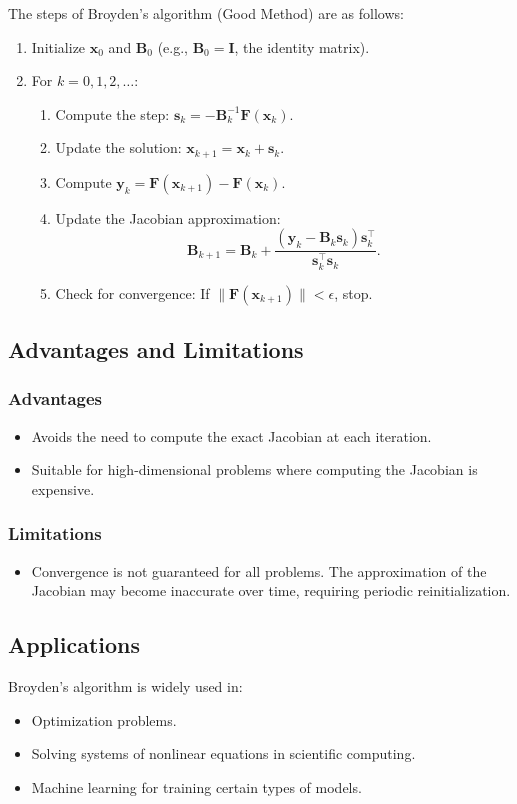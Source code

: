 \documentclass{article}
\begin{document}
The steps of Broyden’s algorithm (Good Method) are as follows:
\begin{enumerate}
   \item Initialize \( \mathbf{x}_0 \) and \( \mathbf{B}_0 \) (e.g., \( \mathbf{B}_0 = \mathbf{I} \), the identity matrix).
   \item For \( k = 0, 1, 2, \dots \):
   \begin{enumerate}
       \item Compute the step: \( \mathbf{s}_k = -\mathbf{B}_k^{-1} \mathbf{F}(\mathbf{x}_k) \).
       \item Update the solution: \( \mathbf{x}_{k+1} = \mathbf{x}_k + \mathbf{s}_k \).
       \item Compute \( \mathbf{y}_k = \mathbf{F}(\mathbf{x}_{k+1}) - \mathbf{F}(\mathbf{x}_k) \).
       \item Update the Jacobian approximation:
       \[
       \mathbf{B}_{k+1} = \mathbf{B}_k + \frac{(\mathbf{y}_k - \mathbf{B}_k \mathbf{s}_k) \mathbf{s}_k^\top}{\mathbf{s}_k^\top \mathbf{s}_k}.
       \]
       \item Check for convergence: If \( \|\mathbf{F}(\mathbf{x}_{k+1})\| < \epsilon \), stop.
   \end{enumerate}
\end{enumerate}

\subsection*{Advantages and Limitations}

\subsubsection*{Advantages}
\begin{itemize}
   \item Avoids the need to compute the exact Jacobian at each iteration.
   \item Suitable for high-dimensional problems where computing the Jacobian is expensive.
\end{itemize}

\subsubsection*{Limitations}
\begin{itemize}
   \item Convergence is not guaranteed for all problems.
   \� The approximation of the Jacobian may become inaccurate over time, requiring periodic reinitialization.
\end{itemize}

\subsection*{Applications}

Broyden’s algorithm is widely used in:
\begin{itemize}
   \item Optimization problems.
   \item Solving systems of nonlinear equations in scientific computing.
   \item Machine learning for training certain types of models.
\end{itemize}
\end{document}
